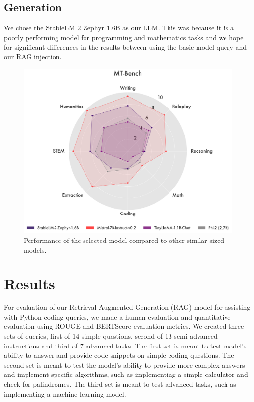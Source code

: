 \documentclass[fleqn,moreauthors,10pt]{ds_report}
\begin{document}
\subsection*{Generation}
We chose the StableLM 2 Zephyr 1.6B \cite{stabilityAI} as our LLM. This was because it is a poorly performing model for programming and mathematics tasks and we hope for significant differences in the results between using the basic model query and our RAG injection. 
\begin{figure}[h]
    \centering
    \includegraphics[width=0.8\linewidth]{fig/QH00HVM3lg-5f17U_py4K.png}
    \caption{Performance of the selected model compared to other similar-sized models.}
    \label{fig:example} %
\end{figure}

\section*{Results}

For evaluation of our Retrieval-Augmented Generation (RAG) model for assisting with Python coding queries, we made a human evaluation and quantitative evaluation using ROUGE and BERTScore evaluation metrics. We created three sets of queries, first of 14 simple questions, second of 13 semi-advanced instructions and third of 7 advanced tasks. The first set is meant to test model's ability to answer and provide code snippets on simple coding questions. The second set is meant to test the model's ability to provide more complex answers and implement specific algorithms, such as implementing a simple calculator and check for palindromes. The third set is meant to test advanced tasks, such as implementing a machine learning model. 
\end{document}
